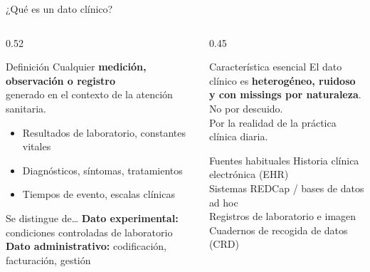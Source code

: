 \documentclass[aspectratio=169,10pt]{beamer}
\begin{document}
\begin{frame}{¿Qué es un dato clínico?}
  \begin{columns}[T]
    \begin{column}{0.52\textwidth}
      \begin{block}{Definición}
        \small Cualquier \textbf{medición, observación o registro}\\
        generado en el contexto de la atención sanitaria.
        \vspace{3mm}
        \begin{itemize}\small
          \item Resultados de laboratorio, constantes vitales
          \item Diagnósticos, síntomas, tratamientos
          \item Tiempos de evento, escalas clínicas
        \end{itemize}
      \end{block}
      \vspace{3mm}
      \begin{block}{Se distingue de\ldots}
        \scriptsize
        \textbf{Dato experimental:} condiciones controladas de laboratorio\\[1mm]
        \textbf{Dato administrativo:} codificación, facturación, gestión
      \end{block}
    \end{column}
    \begin{column}{0.45\textwidth}
      \vspace{3mm}
      \begin{block}{Característica esencial}
        \small El dato clínico es \textbf{heterogéneo, ruidoso\\
        y con missings por naturaleza}.\\[2mm]
        \scriptsize No por descuido.\\
        Por la realidad de la práctica clínica diaria.
      \end{block}
      \vspace{3mm}
      \begin{exampleblock}{Fuentes habituales}
        \scriptsize
        Historia clínica electrónica (EHR)\\
        Sistemas REDCap / bases de datos ad hoc\\
        Registros de laboratorio e imagen\\
        Cuadernos de recogida de datos (CRD)
      \end{exampleblock}
    \end{column}
  \end{columns}
\end{frame}
\end{document}
